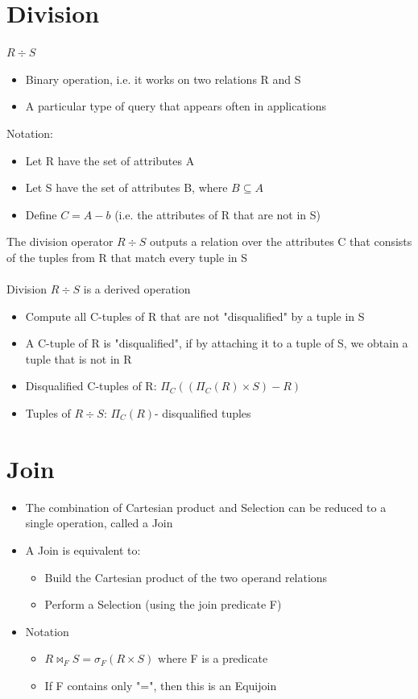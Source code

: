 \documentclass{article}[18pt]
\begin{document}
\section{Division}
$R\div S$
\begin{itemize}
	\item Binary operation, i.e. it works on two relations R and S
	\item A particular type of query that appears often in applications
\end{itemize}
Notation:
\begin{itemize}
	\item Let R have the set of attributes A
	\item Let S have the set of attributes B, where $B\subseteq A$
	\item Define $C=A-b$ (i.e. the attributes of R that are not in S)
\end{itemize}
The division operator $R\div S$ outputs a relation over the attributes C that consists of the tuples from R that match every tuple in S\\
\\
Division $R\div S$ is a derived operation
\begin{itemize}
	\item Compute all C-tuples of R that are not "disqualified" by a tuple in S
	\item A C-tuple of R is "disqualified", if by attaching it to a tuple of S, we obtain a tuple that is not in R
	\item Disqualified C-tuples of  R: $\Pi_C((\Pi_C(R)\times S)-R)$
	\item Tuples of $R\div S$: $\Pi_C(R)$- disqualified tuples
\end{itemize}
\section{Join}
\begin{itemize}
	\item The combination of Cartesian product and Selection can be reduced to a single operation, called a Join
	\item A Join is equivalent to:
	\begin{itemize}
		\item Build the Cartesian product of the two operand relations 
		\item Perform a Selection (using the join predicate F)
	\end{itemize}
	\item Notation
	\begin{itemize}
		\item $R\bowtie_F S=\sigma_F(R\times S)$ where F is a predicate
		\item If F contains only "=", then this is an Equijoin
	\end{itemize}
\end{itemize}
\end{document}
